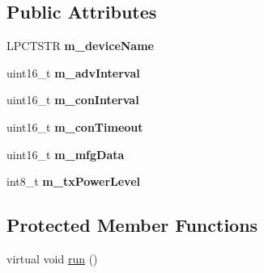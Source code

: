 \subsection*{Public Attributes}
\begin{DoxyCompactItemize}
\item 
\hypertarget{classble_serial_a78f3d21e3339ad260debc30fa68727db}{L\-P\-C\-T\-S\-T\-R {\bfseries m\-\_\-device\-Name}}\label{classble_serial_a78f3d21e3339ad260debc30fa68727db}

\item 
\hypertarget{classble_serial_a328ad9cf98fc3411f9b1a0ad5862e5cd}{uint16\-\_\-t {\bfseries m\-\_\-adv\-Interval}}\label{classble_serial_a328ad9cf98fc3411f9b1a0ad5862e5cd}

\item 
\hypertarget{classble_serial_aebe173e86e517060559de0bc6be7fdbf}{uint16\-\_\-t {\bfseries m\-\_\-con\-Interval}}\label{classble_serial_aebe173e86e517060559de0bc6be7fdbf}

\item 
\hypertarget{classble_serial_a09388d6f83ce001f58b0774063b9c685}{uint16\-\_\-t {\bfseries m\-\_\-con\-Timeout}}\label{classble_serial_a09388d6f83ce001f58b0774063b9c685}

\item 
\hypertarget{classble_serial_a23cb70686a4d09db4f3d51bc879ab8ad}{uint16\-\_\-t {\bfseries m\-\_\-mfg\-Data}}\label{classble_serial_a23cb70686a4d09db4f3d51bc879ab8ad}

\item 
\hypertarget{classble_serial_ab00aa599afeaae642e8c7830678b3083}{int8\-\_\-t {\bfseries m\-\_\-tx\-Power\-Level}}\label{classble_serial_ab00aa599afeaae642e8c7830678b3083}

\end{DoxyCompactItemize}
\subsection*{Protected Member Functions}
\begin{DoxyCompactItemize}
\item 
virtual void \hyperlink{classble_serial_a4dafdc7b9fd47f760707156e8937f74e}{run} ()
\end{DoxyCompactItemize}
